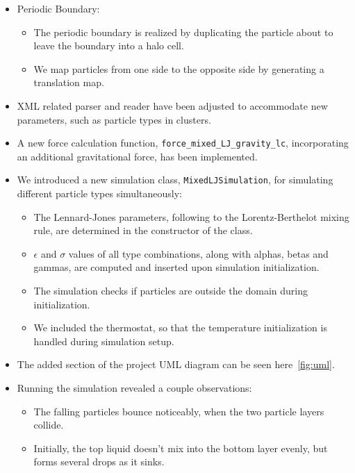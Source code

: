 \documentclass{article}
\begin{document}
    \begin{itemize}
        \item Periodic Boundary:
        \begin{itemize}
            \item The periodic boundary is realized by duplicating the particle about to leave the boundary into a halo cell.
            \item We map particles from one side to the opposite side by generating a translation map.
        \end{itemize}
        \item XML related parser and reader have been adjusted to accommodate new parameters, such as particle types in clusters.
        \item A new force calculation function, \texttt{force\_mixed\_LJ\_gravity\_lc}, incorporating an additional gravitational force, has been implemented.
        \item We introduced a new simulation class, \texttt{MixedLJSimulation}, for simulating different particle types simultaneously:
        \begin{itemize}
            \item The Lennard-Jones parameters, following to the Lorentz-Berthelot mixing rule, are determined in the constructor of the class.
            \item $\epsilon$ and $\sigma$ values of all type combinations, along with alphas, betas and gammas, are computed and inserted upon simulation initialization.
            \item The simulation checks if particles are outside the domain during initialization.
            \item We included the thermostat, so that the temperature initialization is handled during simulation setup.
        \end{itemize}
        \item The added section of the project UML diagram can be seen here\ \ref{fig:uml}.
        \item Running the simulation revealed a couple observations:
        \begin{itemize}
            \item The falling particles bounce noticeably, when the two particle layers collide.
            \item Initially, the top liquid doesn't mix into the bottom layer evenly, but forms several drops as it sinks.
        \end{itemize}
    \end{itemize}
\end{document}
